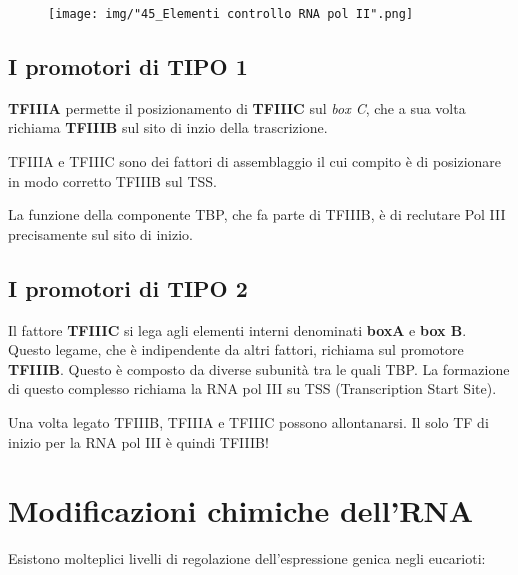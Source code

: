 \documentclass[11pt]{book}
\begin{document}
\begin{figure}[htp]
\centering
\texttt{[image: img/"45\_Elementi controllo RNA pol II".png]}
\caption{}
\label{elementi-controllo-rna-pol-ii}
\end{figure}

\section{I promotori di TIPO 1}\label{i-promotori-di-tipo-1}

\textbf{TFIIIA} permette il posizionamento di \textbf{TFIIIC} sul
\emph{box C}, che a sua volta richiama \textbf{TFIIIB} sul sito di inzio
della trascrizione.

TFIIIA e TFIIIC sono dei fattori di assemblaggio il cui compito è di
posizionare in modo corretto TFIIIB sul TSS.

La funzione della componente TBP, che fa parte di TFIIIB, è di reclutare
Pol III precisamente sul sito di inizio.

\section{I promotori di TIPO 2}\label{i-promotori-di-tipo-2}

Il fattore \textbf{TFIIIC} si lega agli elementi interni denominati
\textbf{boxA} e \textbf{box B}. Questo legame, che è indipendente da
altri fattori, richiama sul promotore \textbf{TFIIIB}. Questo è composto
da diverse subunità tra le quali TBP. La formazione di questo complesso
richiama la RNA pol III su TSS (Transcription Start Site).

Una volta legato TFIIIB, TFIIIA e TFIIIC possono allontanarsi. Il solo
TF di inizio per la RNA pol III è quindi TFIIIB!

\chapter{Modificazioni chimiche
dell'RNA}\label{modificazioni-chimiche-dellrna}

Esistono molteplici livelli di regolazione dell'espressione genica negli
eucarioti:
\end{document}
